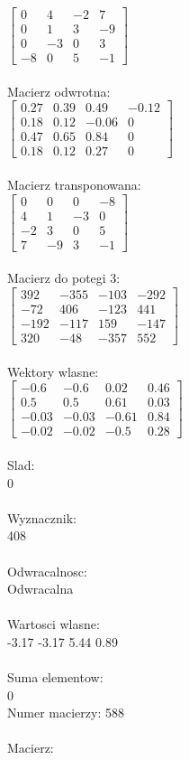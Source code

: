 \documentclass[a4paper,12pt]{article}
\begin{document}
$\begin{bmatrix} 0&4&-2&7\\0&1&3&-9\\0&-3&0&3\\-8&0&5&-1 \end{bmatrix}$
\\
\\
Macierz odwrotna:\\

$\begin{bmatrix} 0.27&0.39&0.49&-0.12\\0.18&0.12&-0.06&0\\0.47&0.65&0.84&0\\0.18&0.12&0.27&0 \end{bmatrix}$
\\
\\
Macierz transponowana:\\

$\begin{bmatrix} 0&0&0&-8\\4&1&-3&0\\-2&3&0&5\\7&-9&3&-1 \end{bmatrix}$
\\
\\
Macierz do potegi 3:\\

$\begin{bmatrix} 392&-355&-103&-292\\-72&406&-123&441\\-192&-117&159&-147\\320&-48&-357&552 \end{bmatrix}$
\\
\\
Wektory wlasne:\\

$\begin{bmatrix} -0.6&-0.6&0.02&0.46\\0.5&0.5&0.61&0.03\\-0.03&-0.03&-0.61&0.84\\-0.02&-0.02&-0.5&0.28 \end{bmatrix}$
\\
\\
Slad:\\
0
\\
\\
Wyznacznik:\\
408
\\
\\
Odwracalnosc:\\
Odwracalna
\\
\\
Wartosci wlasne:\\
-3.17 -3.17 5.44 0.89
\\
\\
Suma elementow:\\
0
\\
\newpage
Numer macierzy:
588
\\
\\
Macierz:\\
\end{document}
